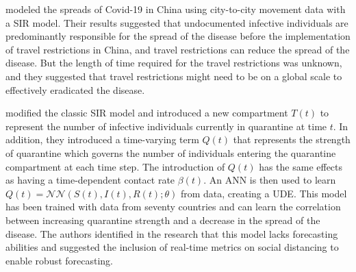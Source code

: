 \citeauthor{liSubstantialUndocumentedInfection2020} \cite{liSubstantialUndocumentedInfection2020} modeled the spreads of Covid-19 in China using city-to-city movement data with a SIR model.
Their results suggested that undocumented infective individuals are predominantly responsible for the spread of the disease before the implementation of travel restrictions in China, and travel restrictions can reduce the spread of the disease.
But the length of time required for the travel restrictions was unknown, and they suggested that travel restrictions might need to be on a global scale to effectively eradicated the disease.

\citeauthor{dandekarMachineLearningAidedGlobal2020a} \cite{dandekarMachineLearningAidedGlobal2020a} modified the classic SIR model and introduced a new compartment $T(t)$ to represent the number of infective individuals currently in quarantine at time $t$.
In addition, they introduced a time-varying term $Q(t)$ that represents the strength of quarantine which governs the number of individuals entering the quarantine compartment at each time step.
The introduction of $Q(t)$ has the same effects as having a time-dependent contact rate $\beta(t)$.
An \gls{ANN} is then used to learn $Q(t) = \mathcal{NN}(S(t),I(t),R(t); \theta)$ from data, creating a \gls{UDE}.
This model has been trained with data from seventy countries and can learn the correlation between increasing quarantine strength and a decrease in the spread of the disease.
The authors identified in the research that this model lacks forecasting abilities and suggested the inclusion of real-time metrics on social distancing to enable robust forecasting.
